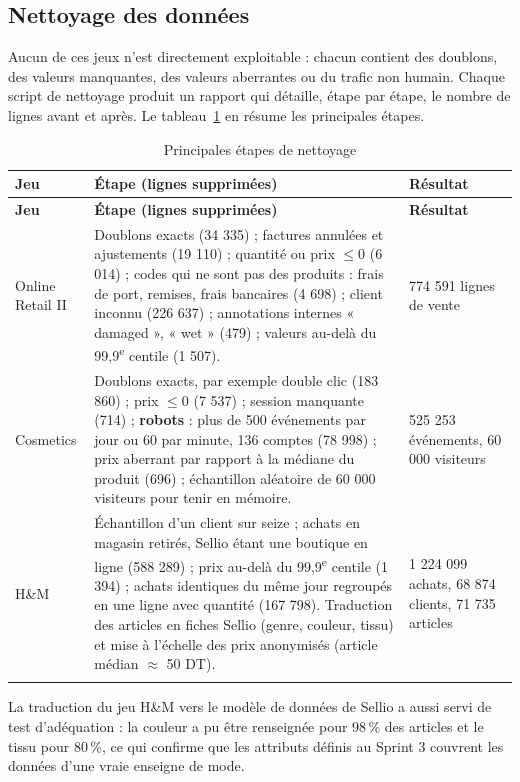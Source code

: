 \subsection{Nettoyage des données}
Aucun de ces jeux n'est directement exploitable : chacun contient des doublons, des valeurs manquantes, des valeurs aberrantes ou du trafic non humain. Chaque script de nettoyage produit un rapport qui détaille, étape par étape, le nombre de lignes avant et après. Le tableau~\ref{tab:nettoyage} en résume les principales étapes.

\renewcommand{\arraystretch}{1.3}
\begin{longtable}{|p{2.6cm}|p{8.6cm}|p{3.4cm}|}
\hline
\textbf{Jeu} & \textbf{Étape (lignes supprimées)} & \textbf{Résultat} \\
\hline
\endfirsthead
\hline
\textbf{Jeu} & \textbf{Étape (lignes supprimées)} & \textbf{Résultat} \\
\hline
\endhead
Online Retail II &
Doublons exacts (34 335) ; factures annulées et ajustements (19 110) ; quantité ou prix $\le 0$ (6 014) ; codes qui ne sont pas des produits : frais de port, remises, frais bancaires (4 698) ; client inconnu (226 637) ; annotations internes « damaged », « wet » (479) ; valeurs au-delà du 99,9\textsuperscript{e} centile (1 507). &
774 591 lignes de vente \\
\hline
Cosmetics &
Doublons exacts, par exemple double clic (183 860) ; prix $\le 0$ (7 537) ; session manquante (714) ; \textbf{robots} : plus de 500 événements par jour ou 60 par minute, 136 comptes (78 998) ; prix aberrant par rapport à la médiane du produit (696) ; échantillon aléatoire de 60 000 visiteurs pour tenir en mémoire. &
525 253 événements, 60 000 visiteurs \\
\hline
H\&M &
Échantillon d'un client sur seize ; achats en magasin retirés, Sellio étant une boutique en ligne (588 289) ; prix au-delà du 99,9\textsuperscript{e} centile (1 394) ; achats identiques du même jour regroupés en une ligne avec quantité (167 798). Traduction des articles en fiches Sellio (genre, couleur, tissu) et mise à l'échelle des prix anonymisés (article médian $\approx$ 50 DT). &
1 224 099 achats, 68 874 clients, 71 735 articles \\
\hline
\caption{Principales étapes de nettoyage}
\label{tab:nettoyage}
\end{longtable}

La traduction du jeu H\&M vers le modèle de données de Sellio a aussi servi de test d'adéquation : la couleur a pu être renseignée pour 98\,\% des articles et le tissu pour 80\,\%, ce qui confirme que les attributs définis au Sprint 3 couvrent les données d'une vraie enseigne de mode.

